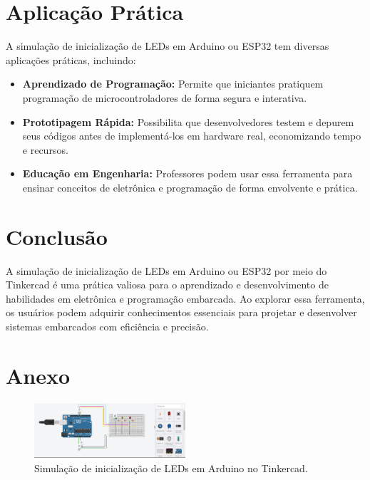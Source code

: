 \documentclass{estacio}
\begin{document}
\section{Aplicação Prática}
A simulação de inicialização de LEDs em Arduino ou ESP32 tem diversas aplicações práticas, incluindo:
\begin{itemize}
    \item \textbf{Aprendizado de Programação:} Permite que iniciantes pratiquem programação de microcontroladores de forma segura e interativa.
    \item \textbf{Prototipagem Rápida:} Possibilita que desenvolvedores testem e depurem seus códigos antes de implementá-los em hardware real, economizando tempo e recursos.
    \item \textbf{Educação em Engenharia:} Professores podem usar essa ferramenta para ensinar conceitos de eletrônica e programação de forma envolvente e prática.
\end{itemize}

\section{Conclusão}
A simulação de inicialização de LEDs em Arduino ou ESP32 por meio do Tinkercad é uma prática valiosa para o aprendizado e desenvolvimento de habilidades em eletrônica e programação embarcada. Ao explorar essa ferramenta, os usuários podem adquirir conhecimentos essenciais para projetar e desenvolver sistemas embarcados com eficiência e precisão.

\section{Anexo}
\begin{figure}[h]
    \centering
    \includegraphics[width=0.5\textwidth]{assets/arduino.png}
    \caption{Simulação de inicialização de LEDs em Arduino no Tinkercad.}
    \label{fig:simulacao_tinkercad}
\end{figure}
\end{document}
